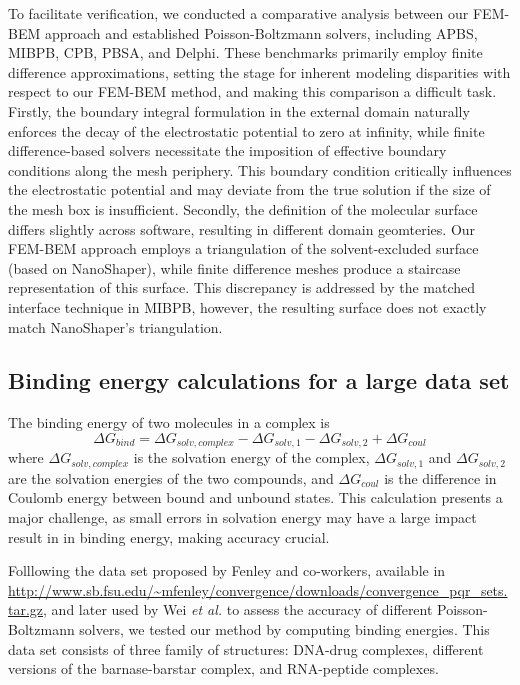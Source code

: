 To facilitate verification, we conducted a comparative analysis between our FEM-BEM approach and established Poisson-Boltzmann solvers, including APBS,\cite{BakerETal2001} MIBPB,\cite{geng2007treatment,chen2011mibpb} CPB,\cite{boschitsch2011fast} PBSA,\cite{wang2008poisson,cai2010performance} and Delphi.\cite{rocchia2001extending} 
These benchmarks primarily employ finite difference approximations, setting the stage for inherent modeling disparities with respect to our FEM-BEM method, and making this comparison a difficult task.
Firstly, the boundary integral formulation in the external domain naturally enforces the decay of the electrostatic potential to zero at infinity, while finite difference-based solvers necessitate the imposition of effective boundary conditions along the mesh periphery. 
This boundary condition critically influences the electrostatic potential and may deviate from the true solution if the size of the mesh box is insufficient. 
Secondly, the definition of the molecular surface differs slightly across software, resulting in different domain geomteries. 
Our FEM-BEM approach employs a triangulation of the solvent-excluded surface (based on NanoShaper\cite{decherchi2013general}), while finite difference meshes produce a staircase representation of this surface. 
This discrepancy is addressed by the matched interface technique in MIBPB,\cite{geng2007treatment,chen2011mibpb} however, the resulting surface does not exactly match NanoShaper's triangulation. 


\subsection*{\sffamily \large Binding energy calculations for a large data set}

The binding energy of two molecules in a complex is 
%
\begin{equation}
\Delta G_{bind} = \Delta G_{solv, complex} - \Delta G_{solv,1} - \Delta G_{solv, 2} + \Delta G_{coul}
\end{equation}
%
where $\Delta G_{solv, complex}$ is the solvation energy of the complex, $\Delta G_{solv, 1}$ and $\Delta G_{solv, 2}$ are the solvation energies of the two compounds, and $\Delta G_{coul}$ is the difference in Coulomb energy between bound and unbound states.
This calculation presents a major challenge, as small errors in solvation energy may have a large impact result in in binding energy, making accuracy crucial.

Folllowing the data set proposed by Fenley and co-workers,\cite{HarrisBoschitcshFenley2013} available in \url{http://www.sb.fsu.edu/~mfenley/convergence/downloads/convergence_pqr_sets.tar.gz}, and later used by Wei {\it et al.}\cite{nguyen2017accurate} to assess the accuracy of different Poisson-Boltzmann solvers, we tested our method by computing binding energies. 
This data set consists of three family of structures: DNA-drug complexes, different versions of the barnase-barstar complex, and RNA-peptide complexes.

